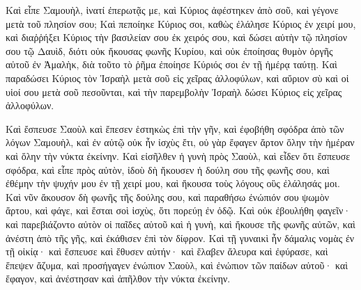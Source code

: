 {Καὶ εἶπε Σαμουὴλ, ἱνατί ἐπερωτᾷς με, καὶ Κύριος ἀφέστηκεν ἀπὸ σοῦ, καὶ γέγονε μετὰ τοῦ πλησίον σου;
Καὶ πεποίηκε Κύριος σοι, καθὼς ἐλάλησε Κύριος ἐν χειρί μου, καὶ διαῤῥήξει Κύριος τὴν βασιλείαν σου ἐκ χειρός σου, καὶ δώσει αὐτὴν τῷ πλησίον σου τῷ Δαυὶδ,
διότι οὐκ ἤκουσας φωνῆς Κυρίου, καὶ οὐκ ἐποίησας θυμὸν ὀργῆς αὐτοῦ ἐν Ἀμαλὴκ, διὰ τοῦτο τὸ ῥῆμα ἐποίησε Κύριός σοι ἐν τῇ ἡμέρᾳ ταύτῃ.
Καὶ παραδώσει Κύριος τὸν Ἰσραὴλ μετὰ σοῦ εἰς χεῖρας ἀλλοφύλων, καὶ αὔριον σὺ καὶ οἱ υἱοί σου μετὰ σοῦ πεσοῦνται, καὶ τὴν παρεμβολὴν Ἰσραὴλ δώσει Κύριος εἰς χεῖρας ἀλλοφύλων.
\par }{\PP {}Καὶ ἔσπευσε Σαοὺλ καὶ ἔπεσεν ἑστηκὼς ἐπὶ τὴν γῆν, καὶ ἐφοβήθη σφόδρα ἀπὸ τῶν λόγων Σαμουὴλ, καὶ ἐν αὐτῷ οὐκ ἦν ἰσχὺς ἔτι, οὐ γὰρ ἔφαγεν ἄρτον ὅλην τὴν ἡμέραν καὶ ὅλην τὴν νύκτα ἐκείνην.
Καὶ εἰσῆλθεν ἡ γυνὴ πρὸς Σαοὺλ, καὶ εἶδεν ὅτι ἔσπευσε σφόδρα, καὶ εἶπε πρὸς αὐτὸν, ἰδοὺ δὴ ἤκουσεν ἡ δούλη σου τῆς φωνῆς σου, καὶ ἐθέμην τὴν ψυχήν μου ἐν τῇ χειρί μου, καὶ ἤκουσα τοὺς λόγους οὓς ἐλάλησάς μοι.
Καὶ νῦν ἄκουσον δὴ φωνῆς τῆς δούλης σου, καὶ παραθήσω ἐνώπιόν σου ψωμὸν ἄρτου, καὶ φάγε, καὶ ἔσται σοὶ ἰσχὺς, ὅτι πορεύῃ ἐν ὁδῷ.
Καὶ οὐκ ἐβουλήθη φαγεῖν· καὶ παρεβιάζοντο αὐτὸν οἱ παῖδες αὐτοῦ καὶ ἡ γυνὴ, καὶ ἤκουσε τῆς φωνῆς αὐτῶν, καὶ ἀνέστη ἀπὸ τῆς γῆς, καὶ ἐκάθισεν ἐπὶ τὸν δίφρον.
Καὶ τῇ γυναικὶ ἦν δάμαλις νομὰς ἐν τῇ οἰκίᾳ· καὶ ἔσπευσε καὶ ἔθυσεν αὐτήν· καὶ ἔλαβεν ἄλευρα καὶ ἐφύρασε, καὶ ἔπεψεν ἄζυμα,
καὶ προσήγαγεν ἐνώπιον Σαοὺλ, καὶ ἐνώπιον τῶν παίδων αὐτοῦ· καὶ ἔφαγον, καὶ ἀνέστησαν καὶ ἀπῆλθον τὴν νύκτα ἐκείνην.

}
